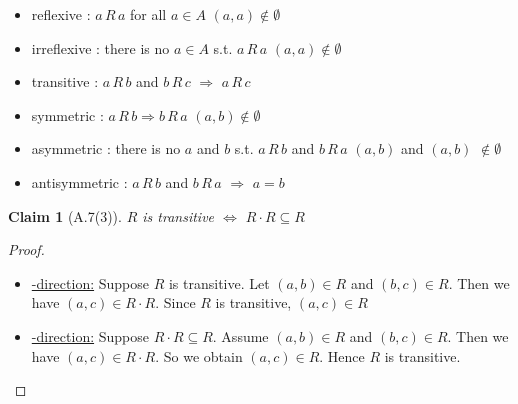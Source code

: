 \documentclass[12pt,aspectratio=169]{beamer}
\theoremstyle{claim}
\newtheorem{claim}[theorem]{Claim}%
\begin{document}
\newcommand{\RL}[2]{#1\, R\, #2}
\begin{frame}
    \begin{itemize}
    \item reflexive     : $\RL{a}{a}$ for all $a \in A$ \quad $(a,a) \notin \emptyset$
    \item irreflexive   : there is no $a \in A$ s.t. $\RL{a}{a}$ \quad $(a,a)\notin \emptyset$
    \item transitive    : $\RL{a}{b}$ and $\RL{b}{c}$ $\Rightarrow$ $\RL{a}{c}$ %
    \item symmetric     : $\RL{a}{b} \Rightarrow \RL{b}{a}$ \quad $(a,b) \notin \emptyset$
    \item asymmetric    : there is no $a$ and $b$ s.t. $\RL{a}{b}$ and $\RL{b}{a}$ \quad $(a,b)$ and $(a,b)$ $\notin \emptyset$
    \item antisymmetric : $\RL{a}{b}$ and $\RL{b}{a}$ $\Rightarrow$ $a=b$
    \end{itemize}
\end{frame}

\begin{frame}
    \begin{claim}[A.7(3)]
        $R$ is transitive $\Leftrightarrow$ $R \cdot R \subseteq R$
    \end{claim}

    \begin{proof}
        \begin{itemize}
            \item \underline{\Rightarrow-direction:}
            Suppose $R$ is transitive.
            Let $(a,b) \in R$ and $(b,c) \in R$.
            Then we have $(a,c) \in R \cdot R$.
            Since $R$ is transitive, $(a,c) \in R$
            \item \underline{\Leftarrow-direction:}
            Suppose $R \cdot R \subseteq R$.
            Assume $(a,b) \in R$ and $(b,c) \in R$.
            Then we have $(a,c) \in R \cdot R$.
            So we obtain $(a,c) \in R$.
            Hence $R$ is transitive.
      \end{itemize}
    \end{proof}
\end{frame}
\end{document}
